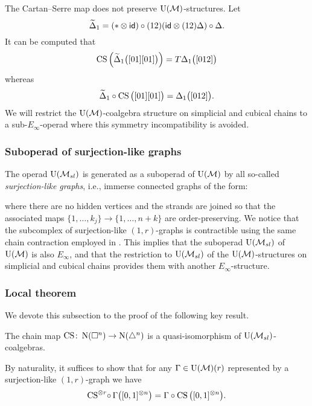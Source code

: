 \begin{example*}
	The Cartan--Serre map does not preserve ${\operatorname{U}(\mathcal{M})}$-structures.
	Let
	\[
	\widetilde\Delta_1 = (\ast \otimes \mathsf{id}) \circ (12) (\mathsf{id} \otimes (12) \Delta) \circ \Delta.
	\]
	It can be computed that
	\[
	\operatorname{CS}\Big( \widetilde\Delta_1 \big( [01][01] \big) \Big) =
	T \Delta_1 \big( [012] \big)
	\]
	whereas
	\[
	\widetilde\Delta_1 \circ \operatorname{CS} \big( [01][01] \big) =
	\Delta_1 \big( [012] \big).
	\]
	We will restrict the ${\operatorname{U}(\mathcal{M})}$-coalgebra structure on simplicial and cubical chains to a sub-$E_\infty$-operad where this symmetry incompatibility is avoided.
\end{example*}

\subsubsection{Suboperad of surjection-like graphs}

The operad ${\operatorname{U}(\mathcal{M}_{sl})}$ is generated as a suboperad of ${\operatorname{U}(\mathcal{M})}$ by all so-called \textit{surjection-like graphs}, i.e., immerse connected graphs of the form:

where there are no hidden vertices and the strands are joined so that the associated maps $\{1, \dots, k_j\} \to \{1, \dots, n+k\}$ are order-preserving.
We notice that the subcomplex of surjection-like $(1,r)$-graphs is contractible using the same chain contraction employed in \cite{medina2020prop1}.
This implies that the suboperad ${\operatorname{U}(\mathcal{M}_{sl})}$ of ${\operatorname{U}(\mathcal{M})}$ is also $E_\infty$, and that the restriction to ${\operatorname{U}(\mathcal{M}_{sl})}$ of the ${\operatorname{U}(\mathcal{M})}$-structures on simplicial and cubical chains provides them with another $E_\infty$-structure.

\subsubsection{Local theorem}

We devote this subsection to the proof of the following key result.

\begin{theorem} \label{t:main local}
	The chain map $\operatorname{CS} \colon \operatorname{N}(\square^n) \to \operatorname{N}(\triangle^n)$ is a quasi-isomorphism of ${\operatorname{U}(\mathcal{M}_{sl})}$-coalgebras.
\end{theorem}

By naturality, it suffices to show that for any $\Gamma \in {\operatorname{U}(\mathcal{M})}(r)$ represented by a surjection-like $(1,r)$-graph we have
\begin{equation} \label{e:Cartan--Serre E-coalgebra map}
	\operatorname{CS}^{\otimes r} \! \circ \, \Gamma \big( [0,1]^{\otimes n} \big) =
	\Gamma \circ \operatorname{CS} \big( [0,1]^{\otimes n} \big).
\end{equation}

